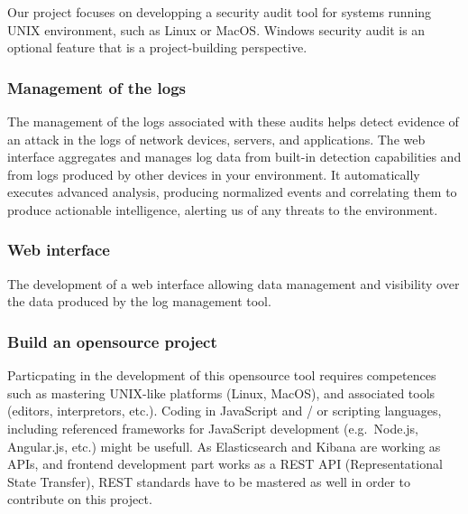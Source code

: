 Our project focuses on developping a security audit tool for systems running UNIX environment, such as Linux or MacOS.
Windows security audit is an optional feature that is a project-building perspective.

\vspace{0.5cm}
\subsubsection{Management of the logs}
The management of the logs associated with these audits helps detect evidence of an attack in the logs of network devices, servers, and applications. The web interface aggregates and manages log data from built-in detection capabilities and from logs produced by other devices in your environment. It automatically executes advanced analysis, producing normalized events and correlating them to produce actionable intelligence, alerting us of any threats to the environment.


\vspace{0.5cm}
\subsubsection{Web interface}
The development of a web interface allowing data management and visibility over the data produced
by the log management tool.


\vspace{0.5cm}
\subsubsection{Build an opensource project}

Particpating in the development of this opensource tool requires competences such as mastering UNIX-like platforms (Linux, MacOS),
and associated tools (editors, interpretors, etc.).
Coding in JavaScript and / or scripting languages, including referenced
frameworks for JavaScript development (e.g.~Node.js, Angular.js, etc.) might be usefull.
As Elasticsearch and Kibana are working as APIs, and frontend development part works
as a REST API (Representational State Transfer), REST standards have to be mastered as well in order to contribute on this project.

\pagebreak

